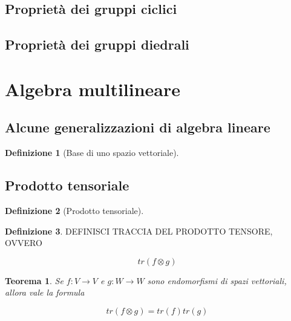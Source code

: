 \documentclass[11pt]{article}
\theoremstyle{plain}
\newtheorem{thm}{Teorema}[section]
\theoremstyle{definition}
\newtheorem{defn}{Definizione}[section]
\theoremstyle{remark}
\begin{document}
\subsection{Proprietà dei gruppi ciclici}

\subsection{Proprietà dei gruppi diedrali}









\newpage
\section{Algebra multilineare}
\subsection{Alcune generalizzazioni di algebra lineare}

\begin{defn}[Base di uno spazio vettoriale]

\end{defn}

\subsection{Prodotto tensoriale}


  


\begin{defn}[Prodotto tensoriale]

\label{defn:prodotto tensoriale}
\end{defn}







\begin{defn}
DEFINISCI TRACCIA DEL PRODOTTO TENSORE, OVVERO 

\[ tr(f\otimes g)\]

\end{defn}


\begin{thm}
Se $f:V\to V$ e $g:W\to W$ sono endomorfismi di spazi vettoriali, allora vale la formula

\[tr(f\otimes g) = tr(f) tr(g)  \]

\end{thm}
\end{document}
